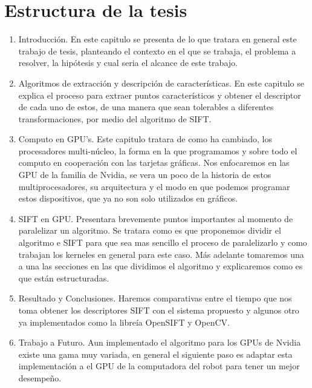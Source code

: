 \section{Estructura de la tesis}
\begin{enumerate}




\item Introducción. En este capitulo se presenta de lo que tratara en general este trabajo de tesis, planteando el contexto en el que se trabaja, el problema a resolver, la hipótesis y cual seria el alcance de este trabajo.

\item Algoritmos de extracción y descripción de características. En este capitulo se explica el proceso para extraer puntos característicos y obtener el descriptor de cada uno de estos, de una manera que sean tolerables a diferentes transformaciones, por medio del algoritmo de SIFT.


\item Computo en GPU's.  Este capitulo tratara de como ha cambiado, los procesadores multi-núcleo, la forma en la que programamos y sobre todo el computo en cooperación con las tarjetas gráficas. Nos enfocaremos en las GPU de la familia de Nvidia, se vera un poco de la historia de estos multiprocesadores, su arquitectura y el modo en que podemos programar estos dispositivos, que ya no son solo utilizados en gráficos.


\item SIFT en GPU. Presentara brevemente puntos importantes al momento de paralelizar un algoritmo.
Se tratara como es que proponemos dividir el algoritmo e SIFT para que sea mas sencillo el proceso de paralelizarlo y como trabajan los kerneles en general para este caso.
Más adelante tomaremos una a una las secciones en las que dividimos el algoritmo y explicaremos como es que están estructuradas.


\item Resultado y Conclusiones. Haremos comparativas entre el tiempo que nos toma obtener los descriptores SIFT con el sistema propuesto y algunos otro ya implementados como la libreía OpenSIFT y OpenCV.

\item Trabajo a Futuro. Aun implementado el algoritmo para los GPUs de Nvidia existe una gama muy variada, en general el siguiente paso es adaptar esta implementación a el GPU de la computadora del robot para tener un mejor desempeño.

\end{enumerate}





